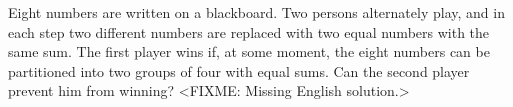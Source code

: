 \problem
Eight numbers are written on a blackboard.
Two persons alternately play, and in each step two different numbers are
replaced with two equal numbers with the same sum.
The first player wins if, at some moment, the eight numbers can be partitioned
into two groups of four with equal sums.
Can the second player prevent him from winning?
\solution
<FIXME: Missing English solution.>
\endproblem
